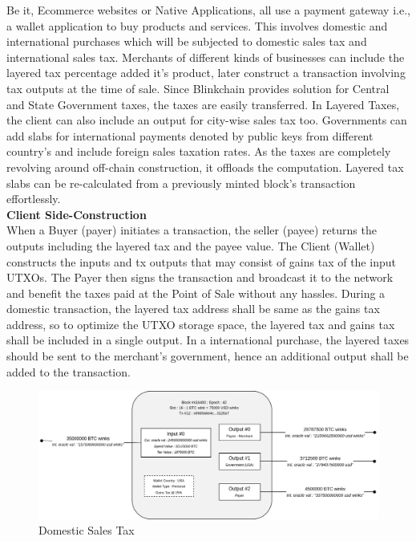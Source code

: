 \documentclass[letterpaper,11pt]{article}
\begin{document}
Be it, Ecommerce websites or Native Applications, all use a payment gateway i.e., a wallet application to buy products and services. This involves domestic and international purchases which will be subjected to domestic sales tax and international sales tax. Merchants of different kinds of businesses can include the layered tax percentage added it's product, later construct a transaction involving tax outputs at the time of sale. Since Blinkchain provides solution for Central and State Government taxes, the taxes are easily transferred. In Layered Taxes, the client can also include an output for city-wise sales tax too. Governments can add slabs for international payments denoted by public keys from different country's and include foreign sales taxation rates. As the taxes are completely revolving around off-chain construction, it offloads the computation. Layered tax slabs can be re-calculated from a previously minted block's transaction effortlessly.\\

\textbf{Client Side-Construction}\\

When a Buyer (payer) initiates a transaction, the seller (payee) returns the outputs including the layered tax and the payee value. The Client (Wallet) constructs the inputs and tx outputs that may consist of gains tax of the input UTXOs. The Payer then signs the transaction and broadcast it to the network and benefit the taxes paid at the Point of Sale without any hassles. During a domestic transaction, the layered tax address shall be same as the gains tax address, so to optimize the UTXO storage space, the layered tax and gains tax shall be included in a single output. In a international purchase, the layered taxes should be sent to the merchant's government, hence an additional output shall be added to the transaction.\\

\begin{figure}
\begin{center}
\includegraphics[width=\textwidth]{layeredtaxdmst}
\caption{Domestic Sales Tax}
\end{center}
\end{figure}
\end{document}
